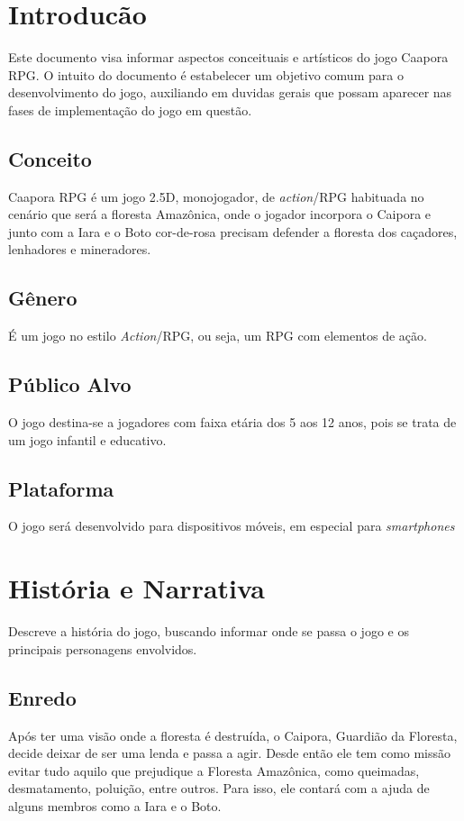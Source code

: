 \label{ap:game-design-document}


\section {Introducão}
\label{ap:introducao}

Este documento visa informar aspectos conceituais e artísticos do jogo Caapora RPG. O intuito do documento é estabelecer um objetivo comum para o desenvolvimento do jogo, auxiliando em duvidas gerais que possam aparecer nas fases de implementação do jogo em questão.

\subsection {Conceito}

Caapora RPG é um jogo 2.5D, monojogador, de \textit{action}/RPG habituada no cenário que será a floresta Amazônica, onde o jogador incorpora o Caipora e junto com a Iara e o Boto cor-de-rosa precisam defender a floresta dos caçadores, lenhadores e mineradores.

\subsection {Gênero}
É um jogo no estilo \textit{Action}/RPG, ou seja, um RPG com elementos de ação. 

\subsection {Público Alvo}
O jogo destina-se a jogadores com faixa etária dos 5 aos 12 anos, pois se trata de um jogo infantil e educativo.

\subsection {Plataforma}
O jogo será desenvolvido para dispositivos móveis, em especial para \textit {smartphones}

\section {História e Narrativa}
\label{ap:historia-e-narrativa}

Descreve a história do jogo, buscando informar onde se passa o jogo e os principais personagens envolvidos.

\subsection{Enredo}
Após ter uma visão onde a floresta é destruída, o Caipora, Guardião da Floresta, decide deixar de ser uma lenda e passa a agir. Desde então ele tem como missão evitar tudo aquilo que prejudique a Floresta Amazônica, como queimadas, desmatamento, poluição, entre outros. Para isso, ele contará com a ajuda de alguns membros como a Iara e o Boto.

